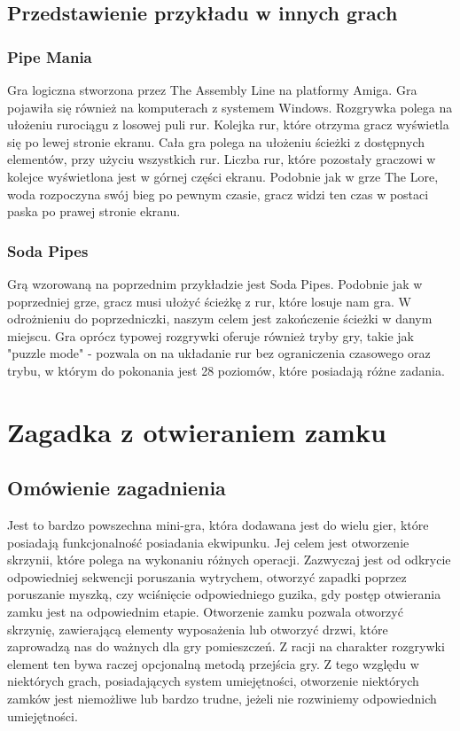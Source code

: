 \documentclass[oneside,polski,logo]{amuthesis}
\begin{document}
\subsection{Przedstawienie przykładu w innych grach}
\subsubsection{Pipe Mania}
Gra logiczna stworzona przez The Assembly Line na platformy Amiga. Gra pojawiła się również na komputerach z systemem Windows. Rozgrywka polega na ułożeniu rurociągu z losowej puli rur. Kolejka rur, które otrzyma gracz wyświetla się po lewej stronie ekranu. Cała gra polega na ułożeniu ścieżki z dostępnych elementów, przy użyciu wszystkich rur. Liczba rur, które pozostały graczowi w kolejce wyświetlona jest w górnej części ekranu. Podobnie jak w grze The Lore, woda rozpoczyna swój bieg po pewnym czasie, gracz widzi ten czas w postaci paska po prawej stronie ekranu. \cite{pipemania}

\subsubsection{Soda Pipes}
Grą wzorowaną na poprzednim przykładzie jest Soda Pipes. Podobnie jak w poprzedniej grze, gracz musi ułożyć ścieżkę z rur, które losuje nam gra. W odrożnieniu do poprzedniczki, naszym celem jest zakończenie ścieżki w danym miejscu. Gra oprócz typowej rozgrywki oferuje również tryby gry, takie jak "puzzle mode" - pozwala on na układanie rur bez ograniczenia czasowego oraz trybu, w którym do pokonania jest 28 poziomów, które posiadają różne zadania. \cite{sp}
\section{Zagadka z otwieraniem zamku}
\subsection{Omówienie zagadnienia}
Jest to bardzo powszechna mini-gra, która dodawana jest do wielu gier, które posiadają funkcjonalność posiadania ekwipunku. Jej celem jest otworzenie skrzynii, które polega na wykonaniu różnych operacji. Zazwyczaj jest od odkrycie odpowiedniej sekwencji poruszania wytrychem, otworzyć zapadki poprzez poruszanie myszką, czy wciśnięcie odpowiedniego guzika, gdy postęp otwierania zamku jest na odpowiednim etapie. Otworzenie zamku pozwala otworzyć skrzynię, zawierającą elementy wyposażenia lub otworzyć drzwi, które zaprowadzą nas do ważnych dla gry pomieszczeń. Z racji na charakter rozgrywki element ten bywa raczej opcjonalną metodą przejścia gry. Z tego względu w niektórych grach, posiadających system umiejętności, otworzenie niektórych zamków jest niemożliwe lub bardzo trudne, jeżeli nie rozwiniemy odpowiednich umiejętności.
\end{document}
